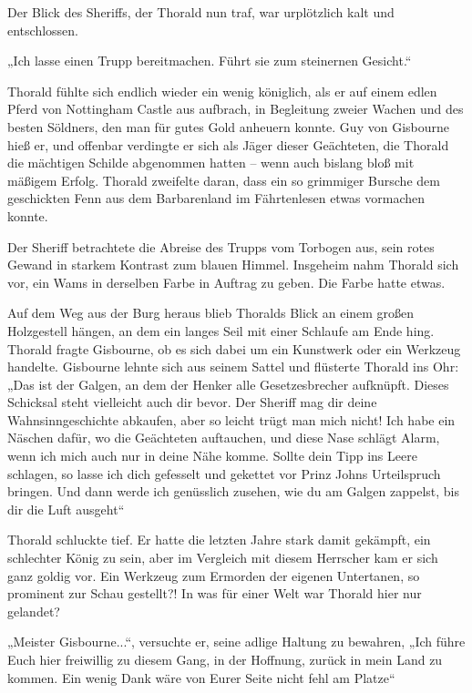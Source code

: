 Der Blick des Sheriffs, der Thorald nun traf, war urplötzlich kalt und entschlossen.

„Ich lasse einen Trupp bereitmachen. Führt sie zum steinernen Gesicht.“



\trennzeichen



Thorald fühlte sich endlich wieder ein wenig königlich, als er auf einem edlen Pferd von Nottingham Castle aus aufbrach, in Begleitung zweier Wachen und des besten Söldners, den man für gutes Gold anheuern konnte. Guy von Gisbourne hieß er, und offenbar verdingte er sich als Jäger dieser Geächteten, die Thorald die mächtigen Schilde abgenommen hatten – wenn auch bislang bloß mit mäßigem Erfolg. Thorald zweifelte daran, dass ein so grimmiger Bursche dem geschickten Fenn aus dem Barbarenland im Fährtenlesen etwas vormachen konnte.

Der Sheriff betrachtete die Abreise des Trupps vom Torbogen aus, sein rotes Gewand in starkem Kontrast zum blauen Himmel. Insgeheim nahm Thorald sich vor, ein Wams in derselben Farbe in Auftrag zu geben. Die Farbe hatte etwas.

Auf dem Weg aus der Burg heraus blieb Thoralds Blick an einem großen Holzgestell hängen, an dem ein langes Seil mit einer Schlaufe am Ende hing. Thorald fragte Gisbourne, ob es sich dabei um ein Kunstwerk oder ein Werkzeug handelte. Gisbourne lehnte sich aus seinem Sattel und flüsterte Thorald ins Ohr: „Das ist der Galgen, an dem der Henker alle Gesetzesbrecher aufknüpft. Dieses Schicksal steht vielleicht auch dir bevor. Der Sheriff mag dir deine Wahnsinngeschichte abkaufen, aber so leicht trügt man mich nicht! Ich habe ein Näschen dafür, wo die Geächteten auftauchen, und diese Nase schlägt Alarm, wenn ich mich auch nur in deine Nähe komme. Sollte dein Tipp ins Leere schlagen, so lasse ich dich gefesselt und gekettet vor Prinz Johns Urteilspruch bringen. Und dann werde ich genüsslich zusehen, wie du am Galgen zappelst, bis dir die Luft ausgeht“

Thorald schluckte tief. Er hatte die letzten Jahre stark damit gekämpft, ein schlechter König zu sein, aber im Vergleich mit diesem Herrscher kam er sich ganz goldig vor. Ein Werkzeug zum Ermorden der eigenen Untertanen, so prominent zur Schau gestellt?! In was für einer Welt war Thorald hier nur gelandet?

„Meister Gisbourne...“, versuchte er, seine adlige Haltung zu bewahren, „Ich führe Euch hier freiwillig zu diesem Gang, in der Hoffnung, zurück in mein Land zu kommen. Ein wenig Dank wäre von Eurer Seite nicht fehl am Platze“

